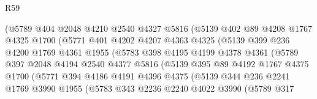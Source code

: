\begin{lexlean}{R59}
\begin{coremodule}
                      (@5789
                        @404
                        @2048
                        @4210
                        @2540
                        @4327
                        @5816
                        (@5139
                          @402
                          @89
                          @4208
                          @1767
                          @4325
                          @1700
                          (@5771
                            @401
                            @4202
                            @4207
                            @4363
                            @4325
                            (@5139
                              @399
                              @236
                              @4200
                              @1769
                              @4361
                              @1955
                              (@5783
                                @398
                                @4195
                                @4199
                                @4378
                                @4361
                                (@5789
                                  @397
                                  @2048
                                  @4194
                                  @2540
                                  @4377
                                  @5816
                                  (@5139
                                    @395
                                    @89
                                    @4192
                                    @1767
                                    @4375
                                    @1700
                                    (@5771
                                      @394
                                      @4186
                                      @4191
                                      @4396
                                      @4375
                                      (@5139
                                        @344
                                        @236
                                        @2241
                                        @1769
                                        @3990
                                        @1955
                                        (@5783
                                          @343
                                          @2236
                                          @2240
                                          @4022
                                          @3990
                                          (@5789
                                            @317

\end{coremodule}
\end{lexlean}
